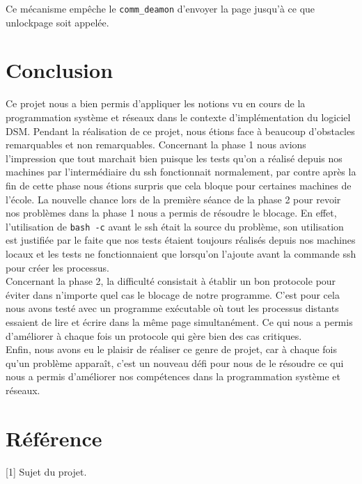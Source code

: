 Ce mécanisme empêche le \texttt{comm\_deamon} d’envoyer la page jusqu'à ce que unlockpage soit appelée.
\newpage
\section{Conclusion}

\setlength{\parindent}{5ex}
Ce projet nous a bien permis d'appliquer les notions vu en cours de la programmation système et réseaux dans le contexte d'implémentation du logiciel DSM.
Pendant la réalisation de ce projet, nous étions face à beaucoup d'obstacles remarquables et non remarquables. Concernant la phase 1 nous avions l'impression que tout marchait bien puisque les tests qu'on a réalisé depuis nos machines par l'intermédiaire du ssh fonctionnait normalement, par contre après la fin de cette phase nous étions surpris que cela bloque pour certaines machines de l'école. La nouvelle chance lors de la première séance de la phase 2 pour revoir nos problèmes dans la phase 1 nous a permis de résoudre le blocage. En effet, l'utilisation de \texttt{bash -c} avant le ssh était la source du problème, son utilisation est justifiée par le faite que nos tests étaient toujours réalisés depuis nos machines locaux et les tests ne fonctionnaient que lorsqu'on l'ajoute avant la commande ssh pour créer les processus. \\
Concernant la phase 2, la difficulté consistait à établir un bon protocole pour éviter dans n'importe quel cas le blocage de notre programme. C'est pour cela nous avons testé avec un programme exécutable où tout les processus distants essaient de lire et écrire dans la même page simultanément. Ce qui nous a permis d'améliorer à chaque fois un protocole qui gère bien des cas critiques.\\
Enfin, nous avons eu le plaisir de réaliser ce genre de projet, car à chaque fois qu'un problème apparaît, c'est un nouveau défi pour nous de le résoudre ce qui nous a permis d'améliorer nos compétences dans la programmation système et réseaux.

\section{Référence}

[1] Sujet du projet.








